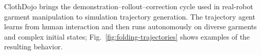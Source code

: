 ClothDojo brings the demonstration--rollout--correction cycle used in
real-robot garment manipulation to simulation trajectory generation. The
trajectory agent learns from human interaction and then runs autonomously on
diverse garments and complex initial states; Fig.~\ref{fig:folding-trajectories}
shows examples of the resulting behavior.
